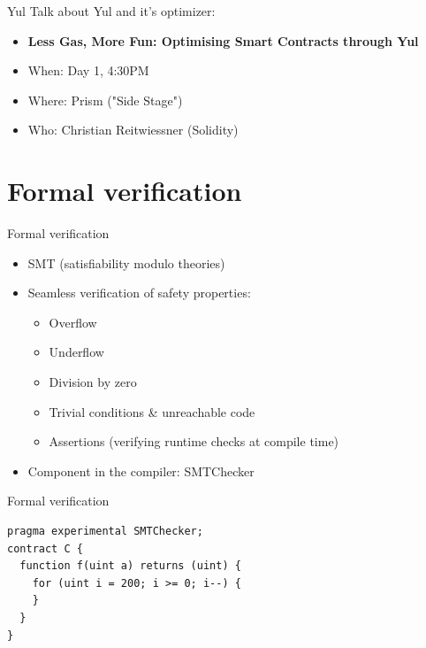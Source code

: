 \documentclass[aspectratio=169,10pt]{beamer}
\begin{document}
\begin{frame}{Yul}
  Talk about Yul and it's optimizer:
  \begin{itemize}
    \item \textbf{Less Gas, More Fun: Optimising Smart Contracts through Yul}
    \item When: Day 1, 4:30PM
    \item Where: Prism ("Side Stage")
    \item Who: Christian Reitwiessner (Solidity)
	\end{itemize}
\end{frame}

\section{Formal verification}

\begin{frame}{Formal verification}
  \begin{itemize}
    \item SMT (satisfiability modulo theories)
    \item Seamless verification of safety properties:
    \begin{itemize}
      \item Overflow
      \item Underflow
      \item Division by zero
      \item Trivial conditions \& unreachable code
      \item Assertions (verifying runtime checks at compile time)
    \end{itemize}
    \item Component in the compiler: SMTChecker
	\end{itemize}
\end{frame}

\begin{frame}[fragile]{Formal verification}
  \begin{mdframed}
  \begin{lstlisting}[language=Solidity]
pragma experimental SMTChecker;
contract C {
  function f(uint a) returns (uint) {
    for (uint i = 200; i >= 0; i--) {
    }
  }
}
  \end{lstlisting}
  \end{mdframed}
\end{frame}
\end{document}
